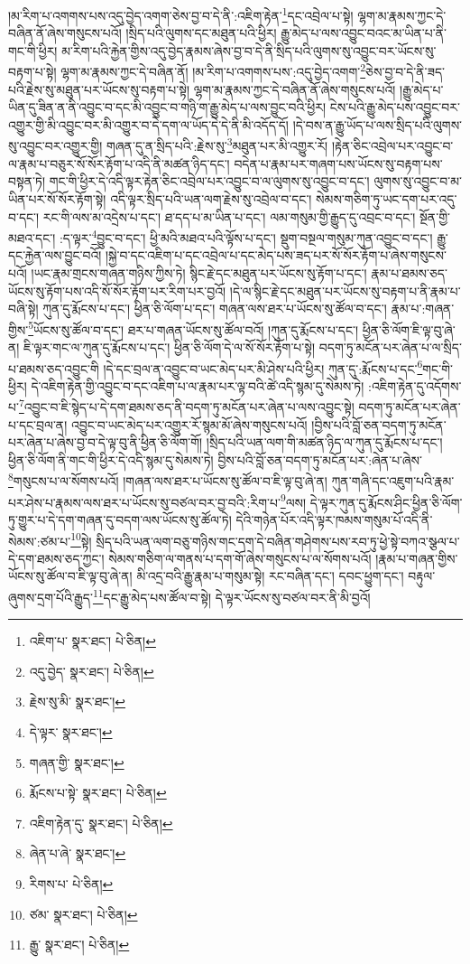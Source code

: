 །མ་རིག་པ་འགགས་པས་འདུ་བྱེད་འགག་ཅེས་བྱ་བ་དེ་ནི་:འཇིག་རྟེན་\footnote{འཇིག་པ་  སྣར་ཐང་།  པེ་ཅིན། }དང་འབྲེལ་པ་སྟེ། ལྷག་མ་རྣམས་ཀྱང་དེ་བཞིན་ནོ་ཞེས་གསུངས་པའོ། །སྲིད་པའི་ལུགས་དང་མཐུན་པའི་ཕྱིར། རྒྱུ་མེད་པ་ལས་འབྱུང་བའང་མ་ཡིན་པ་ནི་གང་གི་ཕྱིར། མ་རིག་པའི་རྐྱེན་གྱིས་འདུ་བྱེད་རྣམས་ཞེས་བྱ་བ་དེ་ནི་སྲིད་པའི་ལུགས་སུ་འབྱུང་བར་ཡོངས་སུ་བརྟག་པ་སྟེ། ལྷག་མ་རྣམས་ཀྱང་དེ་བཞིན་ནོ། །མ་རིག་པ་འགགས་པས་:འདུ་བྱེད་འགག་\footnote{འདུ་བྱེད་  སྣར་ཐང་།  པེ་ཅིན། }ཅེས་བྱ་བ་དེ་ནི་ཟད་པའི་རྗེས་སུ་མཐུན་པར་ཡོངས་སུ་བརྟག་པ་སྟེ། ལྷག་མ་རྣམས་ཀྱང་དེ་བཞིན་ནོ་ཞེས་གསུངས་པའོ། །རྒྱུ་མེད་པ་ཡིན་དུ་ཟིན་ན་ནི་འབྱུང་བ་དང་མི་འབྱུང་བ་གཉི་ག་རྒྱུ་མེད་པ་ལས་བྱུང་བའི་ཕྱིར། ངེས་པའི་རྒྱུ་མེད་པས་འབྱུང་བར་འགྱུར་གྱི་མི་འབྱུང་བར་མི་འགྱུར་བ་དེ་དག་ལ་ཡོད་དེ་དེ་ནི་མི་འདོད་དོ། །དེ་བས་ན་རྒྱུ་ཡོད་པ་ལས་སྲིད་པའི་ལུགས་སུ་འབྱུང་བར་འགྱུར་གྱི། གཞན་དུ་ན་སྲིད་པའི་:རྗེས་སུ་\footnote{རྗེས་སུ་མི་  སྣར་ཐང་། }མཐུན་པར་མི་འགྱུར་རོ། །རྟེན་ཅིང་འབྲེལ་པར་འབྱུང་བ་ལ་རྣམ་པ་བཅུར་སོ་སོར་རྟོག་པ་འདི་ནི་མཚན་ཉིད་དང་། བདེན་པ་རྣམ་པར་གཞག་པས་ཡོངས་སུ་བརྟག་པས་བསྟན་ཏེ། གང་གི་ཕྱིར་དེ་འདི་ལྟར་རྟེན་ཅིང་འབྲེལ་པར་འབྱུང་བ་ལ་ལུགས་སུ་འབྱུང་བ་དང་། ལུགས་སུ་འབྱུང་བ་མ་ཡིན་པར་སོ་སོར་རྟོག་སྟེ། འདི་ལྟར་སྲིད་པའི་ཡན་ལག་རྗེས་སུ་འབྲེལ་བ་དང་། སེམས་གཅིག་ཏུ་ཡང་དག་པར་འདུ་བ་དང་། རང་གི་ལས་མ་འདྲེས་པ་དང་། ཐ་དད་པ་མ་ཡིན་པ་དང་། ལམ་གསུམ་གྱི་རྒྱུད་དུ་འབྲང་བ་དང་། སྔོན་གྱི་མཐའ་དང་། :ད་ལྟར་\footnote{དེ་ལྟར་  སྣར་ཐང་། }བྱུང་བ་དང་། ཕྱི་མའི་མཐའ་པའི་ལྟོས་པ་དང་། སྡུག་བསྔལ་གསུམ་ཀུན་འབྱུང་བ་དང་། རྒྱུ་དང་རྐྱེན་ལས་བྱུང་བའོ། །སྐྱེ་བ་དང་འཇིག་པ་དང་འབྲེལ་པ་དང་མེད་པས་ཟད་པར་སོ་སོར་རྟོག་པ་ཞེས་གསུངས་པའོ། །ཡང་རྣམ་གྲངས་གཞན་གཉིས་ཀྱིས་ཏེ། སྙིང་རྗེ་དང་མཐུན་པར་ཡོངས་སུ་རྟོག་པ་དང་། རྣམ་པ་ཐམས་ཅད་ཡོངས་སུ་རྟོག་པས་འདི་སོ་སོར་རྟོག་པར་རིག་པར་བྱའོ། །དེ་ལ་སྙིང་རྗེ་དང་མཐུན་པར་ཡོངས་སུ་བརྟག་པ་ནི་རྣམ་པ་བཞི་སྟེ། ཀུན་དུ་རྨོངས་པ་དང་། ཕྱིན་ཅི་ལོག་པ་དང་། གཞན་ལས་ཐར་པ་ཡོངས་སུ་ཚོལ་བ་དང་། རྣམ་པ་:གཞན་གྱིས་\footnote{གཞན་གྱི་  སྣར་ཐང་། }ཡོངས་སུ་ཚོལ་བ་དང་། ཐར་པ་གཞན་ཡོངས་སུ་ཚོལ་བའོ། །ཀུན་དུ་རྨོངས་པ་དང་། ཕྱིན་ཅི་ལོག་ཇི་ལྟ་བུ་ཞེ་ན། ཇི་ལྟར་གང་ལ་ཀུན་དུ་རྨོངས་པ་དང་། ཕྱིན་ཅི་ལོག་དེ་ལ་སོ་སོར་རྟོག་པ་སྟེ། བདག་ཏུ་མངོན་པར་ཞེན་པ་ལ་སྲིད་པ་ཐམས་ཅད་འབྱུང་གི །དེ་དང་བྲལ་ན་འབྱུང་བ་ཡང་མེད་པར་མི་ཤེས་པའི་ཕྱིར། ཀུན་དུ་:རྨོངས་པ་དང་\footnote{རྨོངས་པ་སྟེ་  སྣར་ཐང་།  པེ་ཅིན། }གང་གི་ཕྱིར། དེ་འཇིག་རྟེན་གྱི་འབྱུང་བ་དང་འཇིག་པ་ལ་རྣམ་པར་ལྟ་བའི་ཚེ་འདི་སྙམ་དུ་སེམས་ཏེ། :འཇིག་རྟེན་དུ་འདོགས་པ་\footnote{འཇིག་རྟེན་དུ་  སྣར་ཐང་།  པེ་ཅིན། }འབྱུང་བ་ཇི་སྙེད་པ་དེ་དག་ཐམས་ཅད་ནི་བདག་ཏུ་མངོན་པར་ཞེན་པ་ལས་འབྱུང་སྟེ། བདག་ཏུ་མངོན་པར་ཞེན་པ་དང་བྲལ་ན། འབྱུང་བ་ཡང་མེད་པར་འགྱུར་རོ་སྙམ་མོ་ཞེས་གསུངས་པའོ། །བྱིས་པའི་བློ་ཅན་བདག་ཏུ་མངོན་པར་ཞེན་པ་ཞེས་བྱ་བ་དེ་ལྟ་བུ་ནི་ཕྱིན་ཅི་ལོག་གོ། །སྲིད་པའི་ཡན་ལག་གི་མཚན་ཉིད་ལ་ཀུན་དུ་རྨོངས་པ་དང་། ཕྱིན་ཅི་ལོག་ནི་གང་གི་ཕྱིར་དེ་འདི་སྙམ་དུ་སེམས་ཏེ། བྱིས་པའི་བློ་ཅན་བདག་ཏུ་མངོན་པར་:ཞེན་པ་ཞེས་\footnote{ཞེན་པ་ཞེ་  སྣར་ཐང་། }གསུངས་པ་ལ་སོགས་པའོ། །གཞན་ལས་ཐར་པ་ཡོངས་སུ་ཚོལ་བ་ཇི་ལྟ་བུ་ཞེ་ན། ཀུན་གཞི་དང་འཇུག་པའི་རྣམ་པར་ཤེས་པ་རྣམས་ལས་ཐར་པ་ཡོངས་སུ་བཙལ་བར་བྱ་བའི་:རིག་པ་\footnote{རིགས་པ་  པེ་ཅིན། }ལས། དེ་ལྟར་ཀུན་དུ་རྨོངས་ཤིང་ཕྱིན་ཅི་ལོག་ཏུ་གྱུར་པ་དེ་དག་གཞན་དུ་བདག་ལས་ཡོངས་སུ་ཚོལ་ཏེ། དེའི་གཉེན་པོར་འདི་ལྟར་ཁམས་གསུམ་པོ་འདི་ནི་སེམས་:ཙམ་པ་\footnote{ཙམ་  སྣར་ཐང་།  པེ་ཅིན། }སྟེ། སྲིད་པའི་ཡན་ལག་བཅུ་གཉིས་གང་དག་དེ་བཞིན་གཤེགས་པས་རབ་ཏུ་ཕྱེ་སྟེ་བཀའ་སྩལ་པ་དེ་དག་ཐམས་ཅད་ཀྱང་། སེམས་གཅིག་ལ་གནས་པ་དག་གོ་ཞེས་གསུངས་པ་ལ་སོགས་པའོ། །རྣམ་པ་གཞན་གྱིས་ཡོངས་སུ་ཚོལ་བ་ཇི་ལྟ་བུ་ཞེ་ན། མི་འདྲ་བའི་རྒྱུ་རྣམ་པ་གསུམ་སྟེ། རང་བཞིན་དང་། དབང་ཕྱུག་དང་། བརྟུལ་ཞུགས་དྲག་པོའི་རྒྱུད་\footnote{རྒྱུ་  སྣར་ཐང་།  པེ་ཅིན། }དང་རྒྱུ་མེད་པས་ཚོལ་བ་སྟེ། དེ་ལྟར་ཡོངས་སུ་བཙལ་བར་ནི་མི་བྱའོ། 